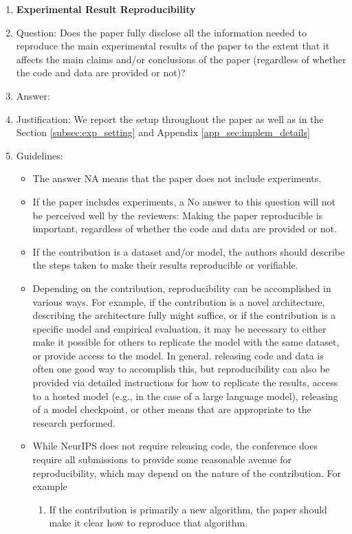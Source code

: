 \documentclass{article}
\begin{document}
\begin{enumerate}
    \item {\bf Experimental Result Reproducibility}
    \item[] Question: Does the paper fully disclose all the information needed to reproduce the main experimental results of the paper to the extent that it affects the main claims and/or conclusions of the paper (regardless of whether the code and data are provided or not)?
    \item[] Answer: \answerYes{} %
    \item[] Justification: We report the setup throughout the paper as well as in the Section \ref{subsec:exp_setting} and Appendix \ref{app_sec:implem_details}
    \item[] Guidelines:
    \begin{itemize}
        \item The answer NA means that the paper does not include experiments.
        \item If the paper includes experiments, a No answer to this question will not be perceived well by the reviewers: Making the paper reproducible is important, regardless of whether the code and data are provided or not.
        \item If the contribution is a dataset and/or model, the authors should describe the steps taken to make their results reproducible or verifiable. 
        \item Depending on the contribution, reproducibility can be accomplished in various ways. For example, if the contribution is a novel architecture, describing the architecture fully might suffice, or if the contribution is a specific model and empirical evaluation, it may be necessary to either make it possible for others to replicate the model with the same dataset, or provide access to the model. In general. releasing code and data is often one good way to accomplish this, but reproducibility can also be provided via detailed instructions for how to replicate the results, access to a hosted model (e.g., in the case of a large language model), releasing of a model checkpoint, or other means that are appropriate to the research performed.
        \item While NeurIPS does not require releasing code, the conference does require all submissions to provide some reasonable avenue for reproducibility, which may depend on the nature of the contribution. For example
        \begin{enumerate}
            \item If the contribution is primarily a new algorithm, the paper should make it clear how to reproduce that algorithm.

\end{enumerate}
\end{itemize}
\end{enumerate}
\end{document}
